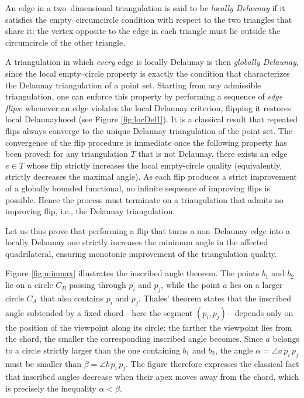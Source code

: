 \documentclass{article}
\begin{document}
An edge in a two--dimensional triangulation is said to be \emph{locally Delaunay}
if it satisfies the empty--circumcircle condition with respect to the two triangles
that share it: the vertex opposite to the edge in each triangle must lie outside
the circumcircle of the other triangle. 

A triangulation in which \emph{every} edge
is locally Delaunay is then \emph{globally Delaunay}, since the local empty--circle
property is exactly the condition that characterizes the Delaunay triangulation of
a point set. Starting from any admissible triangulation, one can enforce this
property by performing a sequence of \emph{edge flips}: whenever an edge violates
the local Delaunay criterion, flipping it restores local Delaunayhood (see Figure \ref{fig:locDel1}). 
It is a classical result that repeated flips always converge to the unique Delaunay
triangulation of the point set.  The convergence of the flip procedure is immediate once the following property
has been proved: for any triangulation \(T\) that is not Delaunay, there exists
an edge \(e \in T\) whose flip strictly increases the local empty-circle 
quality (equivalently, strictly decreases the maximal angle). As each flip 
produces a strict improvement of a globally bounded functional, no infinite 
sequence of improving flips is possible. Hence the process must terminate on 
a triangulation that admits no improving flip, i.e., the Delaunay triangulation.


Let us thus prove that performing a flip that turns a
non--Delaunay edge into a locally Delaunay one strictly increases the minimum
angle in the affected quadrilateral, ensuring monotonic improvement of the
triangulation quality. 

Figure \ref{fig:minmax} illustrates the inscribed angle theorem. 
The points $b_1$ and $b_2$ lie on a circle $C_B$ passing through
$p_i$ and $p_j$, while the point $a$ lies on a larger circle $C_A$ that also
contains $p_i$ and $p_j$. Thales' theorem states that the inscribed angle
subtended by a fixed chord---here the segment $(p_i,p_j)$---depends only on the
position of the viewpoint along its circle: the farther the viewpoint lies from
the chord, the smaller the corresponding inscribed angle becomes. Since $a$
belongs to a circle strictly larger than the one containing $b_1$ and $b_2$, the
angle $\alpha = \angle a\,p_i\,p_j$ must be smaller than 
$\beta = \angle b\,p_i\,p_j$. The figure therefore expresses the classical fact
that inscribed angles decrease when their apex moves away from the chord, which
is precisely the inequality $\alpha < \beta$.
\end{document}
